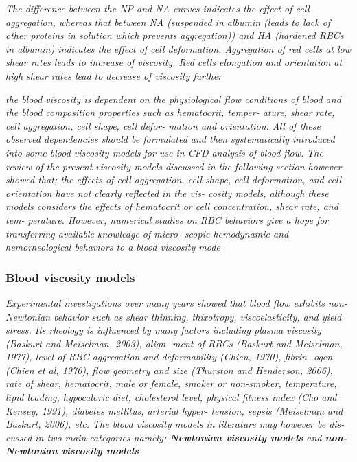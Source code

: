 \documentclass[11pt,letterpaper]{article}
\begin{document}
\textit{The  difference between the NP and NA curves indicates the effect of  cell aggregation, whereas that  between NA (suspended in albumin (leads to lack of other proteins in solution which prevents aggregation))  and HA (hardened RBCs in albumin) indicates the  effect of cell deformation. Aggregation of  red cells at low shear rates leads to  increase  of viscosity. Red cells  elongation and orientation  at high shear rates  lead to decrease of viscosity further}

\textit{the  blood  viscosity  is  dependent on 
the physiological flow conditions of  blood and the
blood composition  properties  such as hematocrit, temper- ature, shear rate,  cell aggregation,  cell shape, cell defor- mation and orientation. All of  these observed dependencies should be formulated  and  then systematically introduced into some  blood viscosity models for use in CFD analysis of blood flow. The review of the present viscosity models discussed in the following section however showed that; the  effects of  cell aggregation, cell shape,  cell deformation, and cell orientation have not  clearly reflected in the vis- cosity  models, although these  models considers  the effects of  hematocrit  or cell concentration, shear rate, and tem- perature.  However, numerical studies on  RBC behaviors give a  hope for  transferring available  knowledge of micro- scopic hemodynamic and hemorheological behaviors to a blood viscosity mode}

\subsubsection*{Blood viscosity  models}
\textit{Experimental investigations over many years showed that blood flow exhibits non-Newtonian behavior such  as shear thinning, thixotropy, viscoelasticity, and yield stress. Its  rheology is influenced by many factors  including plasma viscosity (Baskurt and Meiselman, 2003),  align- ment of  RBCs  (Baskurt  and Meiselman, 1977), level of RBC aggregation and deformability (Chien,  1970),  fibrin- ogen (Chien  et al, 1970), flow  geometry and size (Thurston and Henderson, 2006), rate of shear, hematocrit, male  or female, smoker  or non-smoker, temperature,  lipid loading, hypocaloric diet, cholesterol  level,  physical fitness  index (Cho  and Kensey, 1991), diabetes mellitus, arterial hyper- tension, sepsis (Meiselman and  Baskurt, 2006),  etc. The blood  viscosity  models in literature may however be dis- cussed in two main categories namely;\newline
\textbf{Newtonian viscosity models} and \textbf{non-Newtonian viscosity models}}
\end{document}
